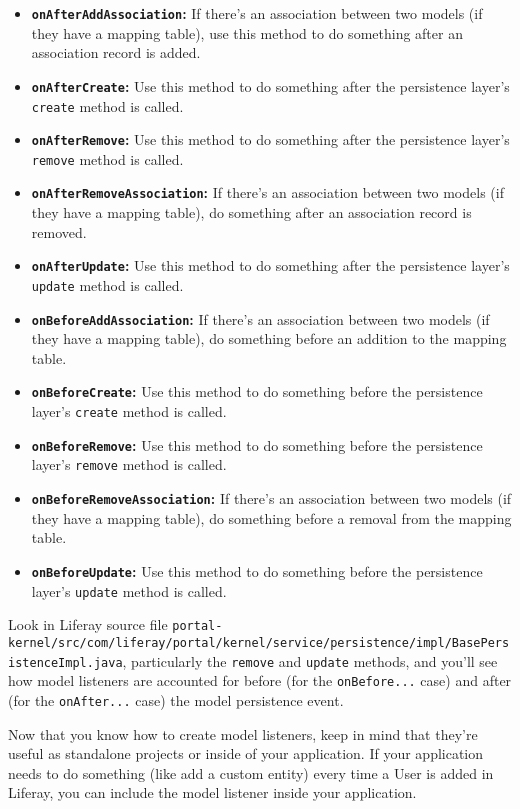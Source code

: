 \begin{itemize}
\tightlist
\item
  \textbf{\texttt{onAfterAddAssociation}:} If there's an association
  between two models (if they have a mapping table), use this method to
  do something after an association record is added.
\item
  \textbf{\texttt{onAfterCreate}:} Use this method to do something after
  the persistence layer's \texttt{create} method is called.
\item
  \textbf{\texttt{onAfterRemove}:} Use this method to do something after
  the persistence layer's \texttt{remove} method is called.
\item
  \textbf{\texttt{onAfterRemoveAssociation}:} If there's an association
  between two models (if they have a mapping table), do something after
  an association record is removed.
\item
  \textbf{\texttt{onAfterUpdate}:} Use this method to do something after
  the persistence layer's \texttt{update} method is called.
\item
  \textbf{\texttt{onBeforeAddAssociation}:} If there's an association
  between two models (if they have a mapping table), do something before
  an addition to the mapping table.
\item
  \textbf{\texttt{onBeforeCreate}:} Use this method to do something
  before the persistence layer's \texttt{create} method is called.
\item
  \textbf{\texttt{onBeforeRemove}:} Use this method to do something
  before the persistence layer's \texttt{remove} method is called.
\item
  \textbf{\texttt{onBeforeRemoveAssociation}:} If there's an association
  between two models (if they have a mapping table), do something before
  a removal from the mapping table.
\item
  \textbf{\texttt{onBeforeUpdate}:} Use this method to do something
  before the persistence layer's \texttt{update} method is called.
\end{itemize}

Look in Liferay source file
\texttt{portal-kernel/src/com/liferay/portal/kernel/service/persistence/impl/BasePersistenceImpl.java},
particularly the \texttt{remove} and \texttt{update} methods, and you'll
see how model listeners are accounted for before (for the
\texttt{onBefore...} case) and after (for the \texttt{onAfter...} case)
the model persistence event.

Now that you know how to create model listeners, keep in mind that
they're useful as standalone projects or inside of your application. If
your application needs to do something (like add a custom entity) every
time a User is added in Liferay, you can include the model listener
inside your application.

